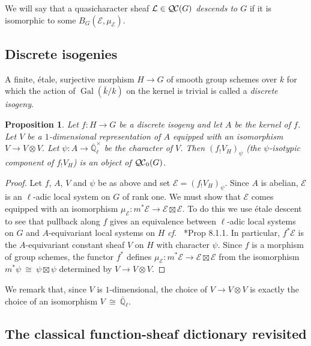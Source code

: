 \documentclass[CM,Submssn,SecEq]{degruyter-crelle} %
\theoremstyle{plain}
\newtheorem{proposition}[theorem]{Proposition}
\theoremstyle{definition}
\theoremstyle{remark}
\newcommand{\EE}{\mathbb{\bar Q}_\ell}
\newcommand{\bFq}{\bar{k}}
\newcommand{\Fq}{k}
\newcommand{\EEx}{\EE^\times}
\DeclareMathOperator{\Gal}{Gal}
\newcommand{\iso}{{\ \cong\ }}
\newcommand{\qcs}[1]{{\mathcal{#1}}}
\newcommand{\QC}{{\mathcal{Q\hskip-0.8pt C}}}
\newcommand{\bQC}{{\QC_0}}
\begin{document}
We will say that a quasicharacter sheaf $\qcs{L} \in \QC(G)$ \emph{descends to $G$} if it is isomorphic to some $B_G(\qcs{E}, \mu_\qcs{E})$.

\subsection{Discrete isogenies}\label{ssec:discrete_isogenies}

A finite, \'etale, surjective morphism $H\to G$ of smooth group schemes over $\Fq$ for which the action of $\Gal(\bFq/\Fq)$ on the kernel is trivial is called a {\it discrete isogeny}.

\begin{proposition}\label{prop:finite}
Let $f: H \to G$ be a discrete isogeny and let $A$ be the kernel of $f$.
Let $V$ be a $1$-dimensional representation of $A$ 
equipped with an isomorphism $V\to V\otimes V$.
Let $\psi : A \to \EEx$ be the character of $V$.
Then $(f_! V_H)_\psi$ (the $\psi$-isotypic component of $f_!V_H$) is an object of $\bQC(G)$.
\end{proposition}

\begin{proof}
Let $f$, $A$, $V$ and $\psi$ be as above and set $\qcs{E} = (f_! V_H)_\psi$.
Since $A$ is abelian, $\qcs{E}$ is an $\ell$-adic local system on $G$ of rank one.
We must show that $\qcs{E}$ comes equipped with an isomorphism $\mu_\qcs{E} : m^* \qcs{E} \to \qcs{E}\boxtimes\qcs{E}$.
To do this we use \'etale descent to see that pullback along $f$ gives an equivalence between $\ell$-adic local systems on $G$ and $A$-equivariant local systems on $H$ {\it cf.\ } \cite{bernstein-luntz:equivariant_sheaves}*{Prop 8.1.1}. 
In particular, $f^*\qcs{E}$ is the $A$-equivariant constant sheaf $V$ on $H$ with character $\psi$.
Since $f$ is a morphism of group schemes, the functor $f^*$ defines $\mu_\qcs{E} : m^*\qcs{E} \to \qcs{E}\boxtimes\qcs{E}$
from the isomorphism $m^*\psi \iso \psi \boxtimes\psi$ determined by $V\to V\otimes V$.
\end{proof}

We remark that, since $V$ is $1$-dimensional, the choice of $V \to V\otimes V$ is exactly the choice of an isomorphism $V\iso \EE$.

\subsection{The classical function-sheaf dictionary revisited}\label{ssec:connected}
\end{document}
